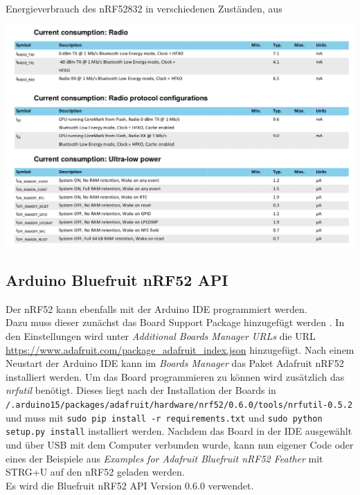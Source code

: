 \begin{table}[h]
  \centering
  \caption{Energieverbrauch des nRF52832 in verschiedenen Zuständen, aus \cite{nordic2017nrf}}
	\includegraphics[width=\textwidth]{images/nrf52consumption.png}
  \label{table:nrf52consumption}
\end{table}


\subsection{Arduino Bluefruit nRF52 API}
Der nRF52 kann ebenfalls mit der Arduino IDE programmiert werden.\\
Dazu muss dieser zunächst das Board Support Package hinzugefügt werden \cite{townsend2017nrf}.
In den Einstellungen wird unter \textit{Additional Boards Manager URLs} die URL \url{https://www.adafruit.com/package_adafruit_index.json} hinzugefügt.
Nach einem Neustart der Arduino IDE kann im \textit{Boards Manager} das Paket Adafruit nRF52 installiert werden.
Um das Board programmieren zu können wird zusätzlich das \textit{nrfutil} benötigt.
Dieses liegt nach der Installation der Boards in \\\texttt{/.arduino15/packages/adafruit/hardware/nrf52/0.6.0/tools/nrfutil-0.5.2} und muss mit \texttt{sudo pip install -r requirements.txt} und \texttt{sudo python setup.py install} installiert werden.
Nachdem das Board in der IDE ausgewählt und über USB mit dem Computer verbunden wurde, kann nun eigener Code oder eines der Beispiele aus \textit{Examples for Adafruit Bluefruit nRF52 Feather} mit STRG+U auf den nRF52 geladen werden.\\
Es wird die Bluefruit nRF52 API Version 0.6.0 verwendet.




